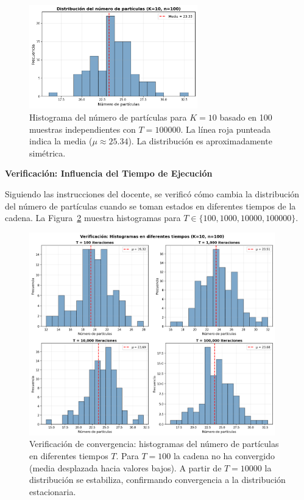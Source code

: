 \begin{figure}[htbp]
\centering
\includegraphics[width=0.65\textwidth]{img/figuras/histograma_particulas.png}
\caption{Histograma del número de partículas para $K=10$ basado en 100 muestras independientes con $T=100000$. La línea roja punteada indica la media ($\mu \approx 25.34$). La distribución es aproximadamente simétrica.}
\label{fig:histograma}
\end{figure}

\textbf{Verificación: Influencia del Tiempo de Ejecución}

Siguiendo las instrucciones del docente, se verificó cómo cambia la distribución del número de partículas cuando se toman estados en diferentes tiempos de la cadena. La Figura~\ref{fig:verificacion} muestra histogramas para $T \in \{100, 1000, 10000, 100000\}$.

\begin{figure}[htbp]
\centering
\includegraphics[width=0.95\textwidth]{img/figuras/verificacion_tiempos.png}
\caption{Verificación de convergencia: histogramas del número de partículas en diferentes tiempos $T$. Para $T=100$ la cadena no ha convergido (media desplazada hacia valores bajos). A partir de $T=10000$ la distribución se estabiliza, confirmando convergencia a la distribución estacionaria.}
\label{fig:verificacion}
\end{figure}

